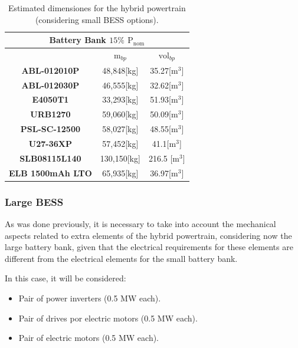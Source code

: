 \begin{table}[H]
	\centering
	\caption{Estimated dimensiones  for the hybrid powertrain (considering small BESS options).}	\label{tab:VW_HybPowerTrain_SmallBESS}
	\begin{tabular}{|c|c|c|}
		\hline
		\multicolumn{3}{|c|}{Battery Bank $15\%$ ${\text{P}}_{\text{nom}}$} \\
		\hline\hline
		 &  $\text{m}_{bp}$ & $\text{vol}_{bp}$\\
		 \hline
		 \textbf{ABL-012010P} &  48,848[kg]  & 35.27[${\text{m}}^{3}$] \\
		 \hline	
		 \textbf{ABL-012030P} & 46,555[kg]  & 32.62[${\text{m}}^{3}$] \\
		 \hline
		 \textbf{E4050T1} & 33,293[kg] & 51.93[${\text{m}}^{3}$] \\
		 \hline\hline
		 
		 \textbf{URB1270} &  59,060[kg]  &  50.09[${\text{m}}^{3}$] \\
		 \hline
		 \textbf{PSL-SC-12500} & 58,027[kg]  & 48.55[${\text{m}}^{3}$] \\
		 \hline
		 \textbf{U27-36XP} & 57,452[kg]  & 41.1[${\text{m}}^{3}$] \\
		 \hline\hline
		 \textbf{SLB08115L140} & 130,150[kg] & 216.5 [${\text{m}}^{3}$] \\
		 \hline
		 \textbf{ELB 1500mAh LTO} & 65,935[kg]  & 36.97[${\text{m}}^{3}$] \\
		 \hline	
	\end{tabular}
\end{table}

\subsubsection{Large BESS}

As was done previously, it is necessary to take into account the mechanical aspects related to extra elements of the hybrid powertrain, considering now the large battery bank, given that the electrical requirements for these elements are different from the electrical elements for the small battery bank.

In this case, it will be considered:

\begin{itemize}
\item Pair of power inverters (0.5 MW each).
\item Pair of drives por electric motors (0.5 MW each).
\item Pair of electric motors (0.5 MW each).
\end{itemize}

